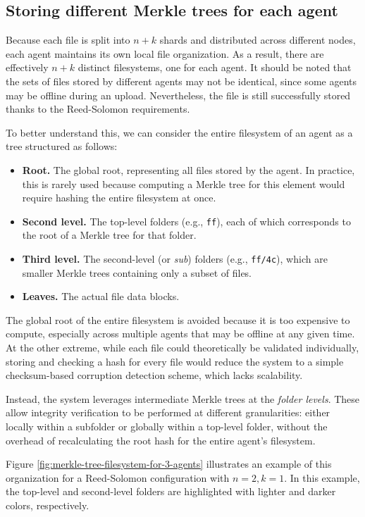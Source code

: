 \subsection{Storing different Merkle trees for each agent}

Because each file is split into $n+k$ shards and distributed across different nodes, each agent maintains its own local file organization. As a result, there are effectively $n+k$ distinct filesystems, one for each agent. It should be noted that the sets of files stored by different agents may not be identical, since some agents may be offline during an upload. Nevertheless, the file is still successfully stored thanks to the Reed-Solomon requirements.

To better understand this, we can consider the entire filesystem of an agent as a tree structured as follows:
\begin{itemize}
    \item \textbf{Root.} The global root, representing all files stored by the agent. In practice, this is rarely used because computing a Merkle tree for this element would require hashing the entire filesystem at once.
    \item \textbf{Second level.} The top-level folders (e.g., \texttt{ff}), each of which corresponds to the root of a Merkle tree for that folder.
    \item \textbf{Third level.} The second-level (or \emph{sub}) folders (e.g., \texttt{ff/4c}), which are smaller Merkle trees containing only a subset of files.
    \item \textbf{Leaves.} The actual file data blocks.
\end{itemize}

The global root of the entire filesystem is avoided because it is too expensive to compute, especially across multiple agents that may be offline at any given time. At the other extreme, while each file could theoretically be validated individually, storing and checking a hash for every file would reduce the system to a simple checksum-based corruption detection scheme, which lacks scalability.  

Instead, the system leverages intermediate Merkle trees at the \emph{folder levels}. These allow integrity verification to be performed at different granularities: either locally within a subfolder or globally within a top-level folder, without the overhead of recalculating the root hash for the entire agent's filesystem.

Figure \ref{fig:merkle-tree-filesystem-for-3-agents} illustrates an example of this organization for a Reed-Solomon configuration with $n=2, k=1$. In this example, the top-level and second-level folders are highlighted with lighter and darker colors, respectively.


